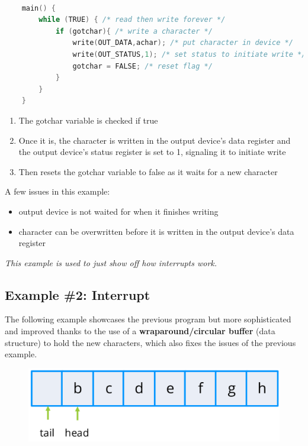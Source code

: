 \begin{lstlisting}[language=c]

    main() {
        while (TRUE) { /* read then write forever */
            if (gotchar){ /* write a character */
                write(OUT_DATA,achar); /* put character in device */
                write(OUT_STATUS,1); /* set status to initiate write */
                gotchar = FALSE; /* reset flag */
            }
        }
    }
\end{lstlisting}

\begin{enumerate}
    \item The gotchar variable is checked if true
    \item Once it is, the character is written in the output device's data register and the output device's status register is set to 1, signaling it to initiate write
    \item Then resets the gotchar variable to false as it waits for a new character
\end{enumerate}

A few issues in this example:

\begin{itemize}
    \item[] output device is not waited for when it finishes writing
    \item[] character can be overwritten before it is written in the output device's data register
\end{itemize}

\textit{This example is used to just show off how interrupts work.}


\subsection{Example \#2: Interrupt}

The following example showcases the previous program but more sophisticated and improved thanks to
the use of a \textbf{wraparound/circular buffer} (data structure) to hold the new characters, which also fixes the
issues of the previous example.


\begin{figure}[H]
    \centering
    \includegraphics[width=0.6\linewidth]{img/image45.png}
\end{figure}


